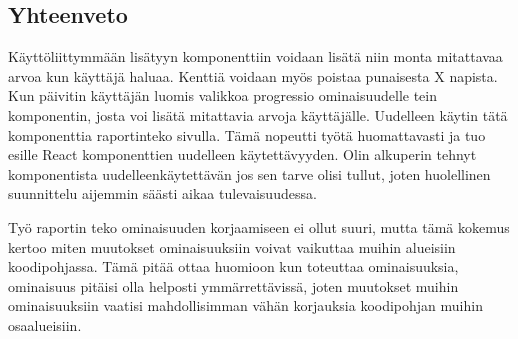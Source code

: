 \subsection*{Yhteenveto}

Käyttöliittymmään lisätyyn komponenttiin voidaan lisätä niin monta mitattavaa arvoa kun käyttäjä haluaa.
Kenttiä voidaan myös poistaa punaisesta X napista.
Kun päivitin käyttäjän luomis valikkoa progressio ominaisuudelle tein komponentin, josta voi lisätä mitattavia arvoja käyttäjälle.
Uudelleen käytin tätä komponenttia raportinteko sivulla.
Tämä nopeutti työtä huomattavasti ja tuo esille React komponenttien uudelleen käytettävyyden.
Olin alkuperin tehnyt komponentista uudelleenkäytettävän jos sen tarve olisi tullut, 
joten huolellinen suunnittelu aijemmin säästi aikaa tulevaisuudessa.

\medskip

Työ raportin teko ominaisuuden korjaamiseen ei ollut suuri,
mutta tämä kokemus kertoo miten muutokset ominaisuuksiin voivat vaikuttaa muihin alueisiin koodipohjassa.
Tämä pitää ottaa huomioon kun toteuttaa ominaisuuksia,
ominaisuus pitäisi olla helposti ymmärrettävissä, 
joten muutokset muihin ominaisuuksiin vaatisi mahdollisimman vähän korjauksia koodipohjan muihin osaalueisiin.





